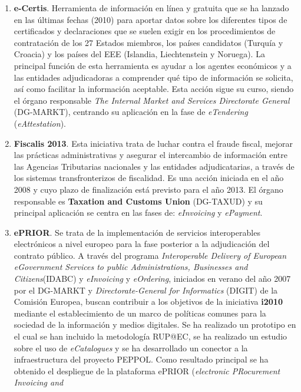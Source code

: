 \begin{enumerate}
 \item \textbf{e-Certis}. Herramienta de información en línea y gratuita que
se ha lanzado en las últimas fechas (2010) para aportar datos sobre los
diferentes tipos de certificados y declaraciones que se suelen exigir
en los procedimientos de contratación de los 27 \gls{Estados} miembros, los países
candidatos (Turquía y Croacia) y los países del \gls{EEE} (Islandia, Liechtenstein y Noruega). 
La principal función de esta herramienta es ayudar a los agentes económicos y a las
entidades adjudicadoras a comprender qué tipo de información se solicita, así como facilitar
la información aceptable. Esta acción sigue su curso, siendo el órgano responsable
\textit{The Internal Market and Services Directorate General} (\gls{DG-MARKT}), centrando su aplicación 
en la fase de \textit{eTendering} (\textit{eAttestation}).
\item \textbf{Fiscalis 2013}. Esta iniciativa trata de luchar contra el fraude
fiscal, mejorar las prácticas administrativas y asegurar el intercambio de información
entre las Agencias Tributarias nacionales y las entidades adjudicatarias, a través
de los sistemas transfronterizos de fiscalidad. Es una acción iniciada en el año 2008
y cuyo plazo de finalización está previsto para el año 2013. El órgano responsable es \textbf{Taxation and Customs Union} (\gls{DG-TAXUD}) y 
su principal aplicación se centra en las fases de: \textit{eInvoicing} y \textit{ePayment}.
\item \textbf{\gls{ePRIOR}}. Se trata de la implementación de servicios interoperables
electrónicos a nivel europeo para la fase posterior a la adjudicación del contrato
público. A través del programa \textit{Interoperable Delivery of European eGovernment Services to public Administrations, Businesses and Citizens}(IDABC) y \textit{eInvoicing} y \textit{eOrdering}, iniciados
en verano del año 2007 por el \gls{DG-MARKT} y \textit{Directorate-General for Informatics} (\gls{DIGIT}) 
de la Comisión Europea, buscan contribuir a los objetivos de la iniciativa \textbf{i2010} mediante el establecimiento
de un marco de políticas comunes para la sociedad de la información y medios digitales. Se ha
realizado un prototipo en el cual se han incluido la metodología RUP@EC, se ha realizado
un estudio sobre el uso de \textit{eCatalogues} y se ha desarrollado un conector
a la infraestructura del proyecto PEPPOL. Como resultado principal se ha obtenido
el despliegue de la plataforma \gls{ePRIOR} (\textit{electronic PRocurement Invoicing and
}
\end{enumerate}
